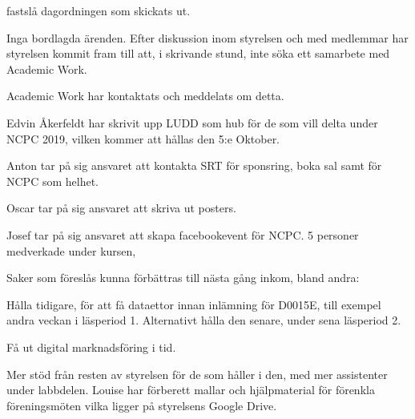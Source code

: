 \documentclass{protokoll}
\begin{document}
\newpage  


\begin{beslut}
     \att fastslå dagordningen som skickats ut.
\end{beslut}

Inga bordlagda ärenden.
Efter diskussion inom styrelsen och med medlemmar har styrelsen kommit fram
till att, i skrivande stund, inte söka ett samarbete med Academic Work. 


Academic Work har kontaktats och meddelats om detta.

Edvin Åkerfeldt har skrivit upp LUDD som hub för de som vill delta under NCPC 
2019, vilken kommer att hållas den 5:e Oktober. 


Anton tar på sig ansvaret att kontakta SRT för sponsring, boka sal samt för 
NCPC som helhet.


Oscar tar på sig ansvaret att skriva ut posters. 

Josef tar på sig ansvaret att skapa facebookevent för NCPC.
5 personer medverkade under kursen, 

Saker som föreslås kunna förbättras till nästa gång inkom, bland andra: 


Hålla tidigare, för att få dataettor innan inlämning för D0015E, till exempel 
andra veckan i läsperiod 1. Alternativt hålla den senare, under sena läsperiod
2.  


Få ut digital marknadsföring i tid. 


Mer stöd från resten av styrelsen för de som håller i den, med mer assistenter
under labbdelen. 
Louise har förberett mallar och hjälpmaterial för förenkla föreningsmöten vilka 
ligger på styrelsens Google Drive. 
\end{document}
